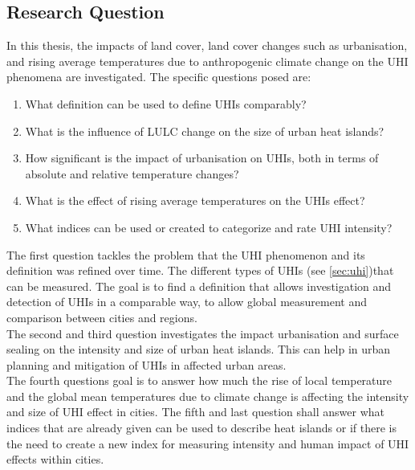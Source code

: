 \documentclass[12pt,a4paper, english,twoside]{scrartcl}
\begin{document}
 \subsection{Research Question}
  In this thesis, the impacts of land cover, land cover changes such as urbanisation, and rising average temperatures due to anthropogenic climate change on the \gls{UHI} phenomena are investigated.
  The specific questions posed are:
  \begin{enumerate}
    \item What definition can be used to define \glspl{UHI} comparably?\label{q1}
    \item What is the influence of \gls{LULC} change on the size of urban heat islands?\label{q2}
    \item How significant is the impact of urbanisation on \glspl{UHI}, both in terms of absolute and relative temperature changes?\label{q3}
    \item What is the effect of rising average temperatures on the \glspl{UHI} effect?\label{q4}
    \item What indices can be used or created to categorize and rate \gls{UHI} intensity?\label{q5}
  \end{enumerate}
  The first question tackles the problem that the \gls{UHI} phenomenon and its definition was refined over time. 
The different types of \glspl{UHI} (see \cref{sec:uhi})that can be measured. 
  The goal is to find a definition that allows investigation and detection of \glspl{UHI} in a comparable way, to allow global measurement and comparison between cities and regions.\\ 
  The second and third question investigates the impact urbanisation and surface sealing on the intensity and size of urban heat islands. 
  This can help in urban planning and mitigation of \glspl{UHI} in affected urban areas.\\ 
  The fourth questions goal is to answer how much the rise of local temperature and the global mean temperatures due to climate change is affecting the intensity and size of \gls{UHI} effect in cities.%
  The fifth and last question shall answer what indices that are already given can be used to describe heat islands or if there is the need to create a new index for measuring intensity and human impact of \gls{UHI} effects within cities.
\end{document}
